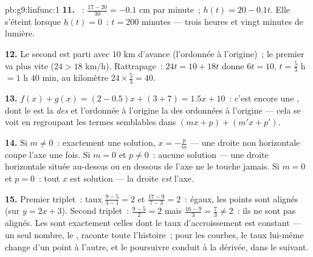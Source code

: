 \begin{solution}{pb:g9:linfunc:1}
\textbf{11.} ~: $\frac{17 - 20}{30} = -0.1$ cm
par minute~; $h(t) = 20 - 0.1t$. Elle s'éteint lorsque
$h(t) = 0$~: $t = 200$ minutes --- trois heures et vingt minutes de
lumière.

\textbf{12.} Le second est parti avec $10$ km d'avance (l'ordonnée à
l'origine)~; le premier va plus vite ($24 > 18$ km/h). Rattrapage~:
$24t = 10 + 18t$ donne $6t = 10$, $t = \frac53$ h $= 1$ h $40$ min,
au kilomètre $24 \times \frac53 = 40$.

\textbf{13.} $f(x) + g(x) = (2 - 0.5)x + (3 + 7) = 1.5x + 10$~:
c'est encore une , dont le  est
la \emph{ des } et l'ordonnée à
l'origine la  des ordonnées à l'origine --- cela se voit en
regroupant les termes semblables dans $(mx + p) + (m'x + p')$.

\textbf{14.} Si $m \neq 0$~: exactement une solution,
$x = -\frac pm$ --- une droite non horizontale coupe l'axe une fois.
Si $m = 0$ et $p \neq 0$~: aucune solution --- une droite
horizontale située au-dessus ou en dessous de l'axe ne le touche
jamais. Si $m = 0$ et $p = 0$~: tout $x$ est solution --- la droite
\emph{est} l'axe.

\textbf{15.} Premier triplet~: taux $\frac{9 - 5}{3 - 1} = 2$ et
$\frac{17 - 9}{7 - 3} = 2$~: égaux, les points sont alignés (sur
$y = 2x + 3$). Second triplet~: $\frac{9-5}{2} = 2$ mais
$\frac{16 - 9}{3} = \frac73 \neq 2$~: ils ne sont pas alignés. Les
 sont exactement celles dont le taux
d'accroissement est constant --- un seul nombre, le , raconte toute l'histoire~; pour les courbes, le taux
lui-même change d'un point à l'autre, et le poursuivre conduit à la
dérivée, dans le  suivant.
\end{solution}
